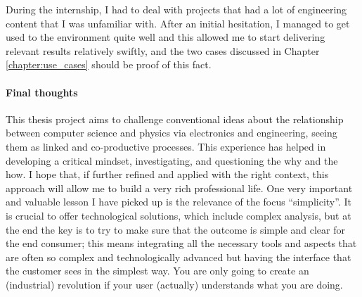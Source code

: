 During the internship, I had to deal with projects that had a lot of engineering content that I was unfamiliar with. 
After an initial hesitation, I managed to get used to the environment quite well and this allowed me to start delivering relevant results relatively swiftly, 
and the two cases discussed in Chapter \ref{chapter:use_cases} should be proof of this fact.

\paragraph{Final thoughts}
This thesis project aims to challenge conventional ideas about the relationship between computer science and physics via electronics and engineering, seeing them as linked and co-productive processes. 
This experience has helped in developing a critical mindset, investigating, and questioning the why and the how. I hope that, if further refined and applied with the right context, this approach will allow me to build a very rich professional life.
One very important and valuable lesson I have picked up is the relevance of the focus ``simplicity''. It is crucial to offer technological solutions, which include complex analysis, 
but at the end the key is to try to make sure that the outcome is simple and clear for the end consumer; 
this means integrating all the necessary tools and aspects that are often so complex and technologically advanced but having the interface that the customer sees in the simplest way. 
You are only going to create an (industrial) revolution if your user (actually) understands what you are doing.

